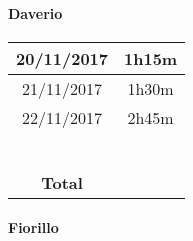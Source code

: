 \paragraph*{Daverio}

\begin{tabular}{|c|c|}

	\hline 

20/11/2017	& 1h15m \\ 

	\hline 

21/11/2017	& 1h30m \\ 

	\hline 

22/11/2017	& 2h45m \\ 

	\hline 

	&  \\ 

	\hline 

	&  \\ 

	\hline 

	&  \\ 

	\hline 

	&  \\ 

	\hline 

	&  \\ 

	\hline 

	&  \\ 

	\hline 

\textbf{Total}	&  \\ 

	\hline 

\end{tabular}


\paragraph*{Fiorillo}

